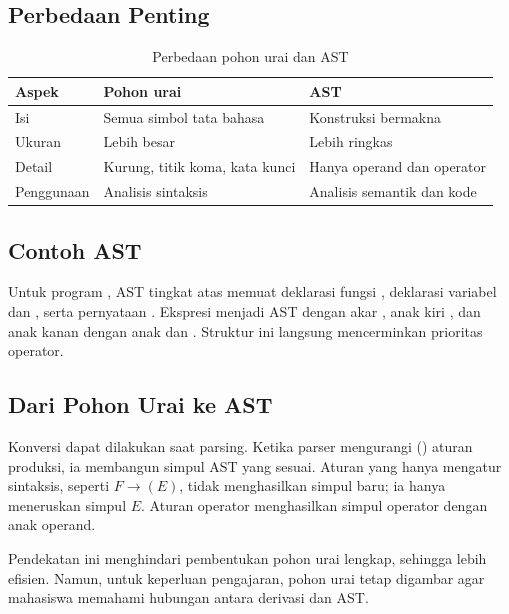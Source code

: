 \subsection{Perbedaan Penting}

\begin{table}[H]
\centering
\caption{Perbedaan pohon urai dan AST}
\label{tab:ch08-parse-ast}
\begin{tabularx}{\textwidth}{@{}lXX@{}}
\toprule
\textbf{Aspek} & \textbf{Pohon urai} & \textbf{AST} \\
\midrule
Isi & Semua simbol tata bahasa & Konstruksi bermakna \\
Ukuran & Lebih besar & Lebih ringkas \\
Detail & Kurung, titik koma, kata kunci & Hanya operand dan operator \\
Penggunaan & Analisis sintaksis & Analisis semantik dan kode \\
\bottomrule
\end{tabularx}
\end{table}

\subsection{Contoh AST}

Untuk program , AST tingkat atas memuat deklarasi
fungsi , deklarasi variabel  dan , serta
pernyataan . Ekspresi  menjadi AST
dengan akar \code{+}, anak kiri , dan anak kanan \code{*}
dengan anak  dan . Struktur ini langsung
mencerminkan prioritas operator.

\subsection{Dari Pohon Urai ke AST}

Konversi dapat dilakukan saat parsing. Ketika parser mengurangi
() aturan produksi, ia membangun simpul AST yang sesuai.
Aturan yang hanya mengatur sintaksis, seperti
\(F \to (E)\), tidak menghasilkan simpul baru; ia hanya meneruskan
simpul \(E\). Aturan operator menghasilkan simpul operator dengan
anak operand.

Pendekatan ini menghindari pembentukan pohon urai lengkap, sehingga
lebih efisien. Namun, untuk keperluan pengajaran, pohon urai tetap
digambar agar mahasiswa memahami hubungan antara derivasi dan AST.
